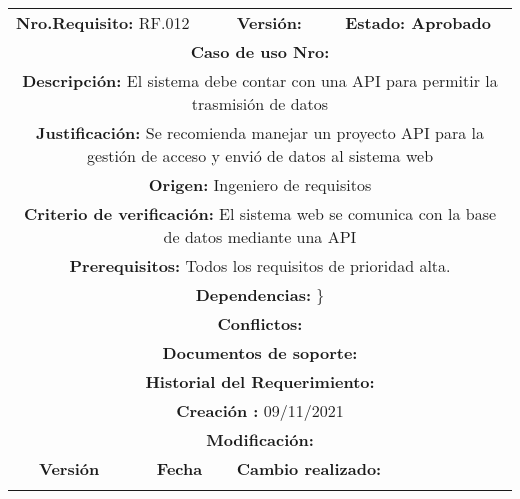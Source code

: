\begin{center}
\begin{tabular}{|c|c|p{4cm}|p{4cm}|}
            \hline
            \rowcolor{red} \multicolumn{4}{|c|}{\textbf{Prioridad:} Alta}  \\
            \hline
            \multicolumn{2}{|l}{\textbf{Nro.Requisito: }RF.012} & \multicolumn{1}{|l}{\textbf{Versión: }} & \multicolumn{1}{|l|}{\textbf{Estado: Aprobado}} \\
            \multicolumn{4}{|p{13cm}|}{\textbf{Caso de uso Nro: }}  \\
            \hline
            \multicolumn{4}{|p{13cm}|}{\textbf{Descripción: } El sistema debe contar con una API para permitir la trasmisión de datos } \\
            \multicolumn{4}{|p{13cm}|}{\textbf{Justificación: } Se recomienda manejar un proyecto API para la gestión de acceso y envió de datos al sistema web} \\ 
            \multicolumn{4}{|p{13cm}|}{\textbf{Origen: }Ingeniero de requisitos}  \\
            \multicolumn{4}{|p{13cm}|}{\textbf{Criterio de verificación: } El sistema web se comunica con la base de datos mediante una API} \\
            \hline
            \multicolumn{4}{|p{13cm}|}{\textbf{Prerequisitos: } Todos los requisitos de prioridad alta. }\\
            \hline \multicolumn{4}{|p{12cm}|}{\textbf{Dependencias: }
               \}
              }  \\
            \multicolumn{4}{|p{12cm}|}{\textbf{Conflictos: }}  \\
            \hline
            \multicolumn{4}{|p{12cm}|}{\textbf{Documentos de soporte: }}  \\
            \hline
            \multicolumn{4}{|p{12cm}|}{\textbf{Historial del Requerimiento: }}  \\
            \multicolumn{4}{|p{12cm}|}{\textbf{Creación : }09/11/2021}  \\
            \multicolumn{4}{|p{12cm}|}{\textbf{Modificación: }}  \\
             \textbf{Versión} & \textbf{Fecha} & \multicolumn{2}{p{8cm}|}{\textbf{Cambio realizado:}} \\
            \hline
                 & &   \multicolumn{2}{p{8cm}|}{}
              \\
            \hline
\end{tabular}




\end{center}
